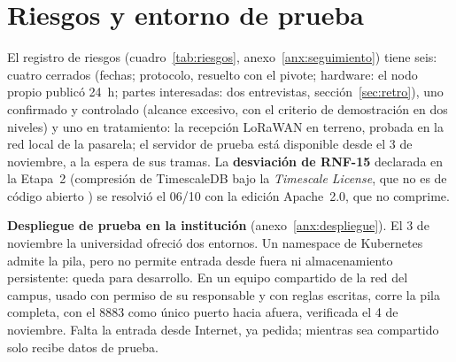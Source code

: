 \section{Riesgos y entorno de prueba}
\label{sec:despliegue-prueba}

El registro de riesgos (cuadro~\ref{tab:riesgos}, anexo~\ref{anx:seguimiento}) tiene seis: cuatro cerrados (fechas; protocolo, resuelto con el pivote; hardware: el nodo propio publicó 24~h; partes interesadas: dos entrevistas, sección~\ref{sec:retro}), uno confirmado y controlado (alcance excesivo, con el criterio de demostración en dos niveles) y uno en tratamiento: la recepción LoRaWAN en terreno, probada en la red local de la pasarela; el servidor de prueba está disponible desde el 3 de noviembre, a la espera de sus tramas. La
\textbf{desviación de RNF-15} declarada en la Etapa~2 (compresión de TimescaleDB bajo la \emph{Timescale License}, que no es de código abierto \parencite{timescalelicencia}) se resolvió el 06/10 con la edición Apache~2.0, que no comprime.

\textbf{Despliegue de prueba en la institución} (anexo~\ref{anx:despliegue}). El 3 de noviembre la universidad ofreció dos entornos. Un namespace de Kubernetes admite la pila, pero no permite entrada desde fuera ni almacenamiento persistente: queda para desarrollo. En un equipo compartido de la red del campus, usado con permiso de su responsable y con reglas escritas, corre la pila completa, con el 8883 como único puerto hacia afuera, verificada el 4 de noviembre. Falta la entrada desde Internet, ya pedida; mientras sea compartido solo recibe datos de prueba.
